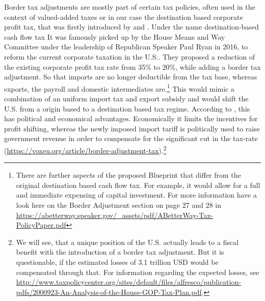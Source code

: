 Border tax adjustments are mostly part of certain tax policies, often used in the context of valued-added taxes or in our case the destination based corporate profit tax, that was firstly introduced by \cite{avi2000globalization} and \cite{bond2002cash}. Under the name destination-based cash flow tax
It was famously picked up by the House Means and Way Committee under the leadership of Republican Speaker Paul Ryan in 2016, to reform the current corporate taxation in the U.S.. They proposed a reduction of the existing corporate profit tax rate from 35\% to 20\%, while adding a border tax adjustment. So that imports are no longer deductible from the tax base, whereas exports, the payroll and domestic intermediates are.\footnote{There are further aspects of the proposed Blueprint that differ from the original destination based cash flow tax. For example, it would allow for a full and immediate expensing of capital investment. For more information have a look here on the Border Adjustment section on page 27 and 28 in \url{https://abetterway.speaker.gov/_assets/pdf/ABetterWay-Tax-PolicyPaper.pdf}} This would mimic a combination of an uniform import tax and export subsidy and would shift the U.S. from a origin based to a destination based tax regime. According to \cite{auerbach2017destination}, this has political and economical advantages. Economically it limits the incentives for profit shifting, whereas the newly imposed import tariff is politically used to raise government revenue in order to compensate for the significant cut in the tax-rate (\url{https://voxeu.org/article/border-adjustment-tax}).\footnote{We will see, that a unique position of the U.S. actually leads to a fiscal benefit with the introduction of a border tax adjustment. But it is questionable, if the estimated losses of 3.1 trillion USD would be compensated through that. For information regarding the expected losses, see \url{http://www.taxpolicycenter.org/sites/default/files/alfresco/publication-pdfs/2000923-An-Analysis-of-the-House-GOP-Tax-Plan.pdf}.} 

